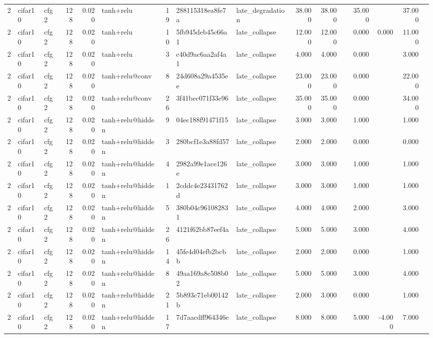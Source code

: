 \begin{table}[htbp]
{\begin{tabular}{@{}rllrrlrllrrrrrrr@{}}
2 & cifar10 & cfg2 & 128 & 0.020 & tanh+relu & 19 & 288115318ea8fe7a & late\_degradation & 38.000 & 38.000 &  & 35.000 &  & 37.000 &  \\
2 & cifar10 & cfg2 & 128 & 0.020 & tanh+relu & 10 & 5fb945deb45c66a1 & late\_collapse & 12.000 & 12.000 &  & 0.000 & 0.000 & 11.000 &  \\
2 & cifar10 & cfg2 & 128 & 0.020 & tanh+relu & 3 & c40d9ac6aa2af4a1 & late\_collapse & 4.000 & 4.000 &  & 0.000 &  & 3.000 &  \\
2 & cifar10 & cfg2 & 128 & 0.020 & tanh+relu@conv & 8 & 24d608a29a4535ee & late\_collapse & 23.000 & 23.000 &  & 0.000 &  & 22.000 &  \\
2 & cifar10 & cfg2 & 128 & 0.020 & tanh+relu@conv & 26 & 3f41bec071f33e96 & late\_collapse & 35.000 & 35.000 &  & 0.000 &  & 34.000 &  \\
2 & cifar10 & cfg2 & 128 & 0.020 & tanh+relu@hidden & 9 & 04ec188f91471f15 & late\_collapse & 3.000 & 3.000 &  & 1.000 &  & 1.000 &  \\
2 & cifar10 & cfg2 & 128 & 0.020 & tanh+relu@hidden & 3 & 280bcf1e3a88fd57 & late\_collapse & 2.000 & 2.000 &  & 0.000 &  & 0.000 &  \\
2 & cifar10 & cfg2 & 128 & 0.020 & tanh+relu@hidden & 4 & 2982a99e1ace126e & late\_collapse & 3.000 & 3.000 &  & 1.000 &  & 1.000 &  \\
2 & cifar10 & cfg2 & 128 & 0.020 & tanh+relu@hidden & 1 & 2cddc4e23431762d & late\_collapse & 3.000 & 3.000 &  & 1.000 &  & 1.000 &  \\
2 & cifar10 & cfg2 & 128 & 0.020 & tanh+relu@hidden & 5 & 380b04c961082831 & late\_collapse & 4.000 & 4.000 &  & 2.000 &  & 3.000 &  \\
2 & cifar10 & cfg2 & 128 & 0.020 & tanh+relu@hidden & 26 & 4121f62bb87eef4a & late\_collapse & 5.000 & 5.000 &  & 3.000 &  & 4.000 &  \\
2 & cifar10 & cfg2 & 128 & 0.020 & tanh+relu@hidden & 14 & 45fe4d04efb2bcbb & late\_collapse & 2.000 & 2.000 &  & 0.000 &  & 1.000 &  \\
2 & cifar10 & cfg2 & 128 & 0.020 & tanh+relu@hidden & 8 & 49aa169a8c508b02 & late\_collapse & 5.000 & 5.000 &  & 3.000 &  & 4.000 &  \\
2 & cifar10 & cfg2 & 128 & 0.020 & tanh+relu@hidden & 21 & 5b893c71eb00142b & late\_collapse & 2.000 & 3.000 &  & 0.000 &  & 1.000 &  \\
2 & cifar10 & cfg2 & 128 & 0.020 & tanh+relu@hidden & 17 & 7d7aacdff964346e & late\_collapse & 8.000 & 8.000 &  & 5.000 & -4.000 & 7.000 &  \\

\end{tabular}}
\end{table}
